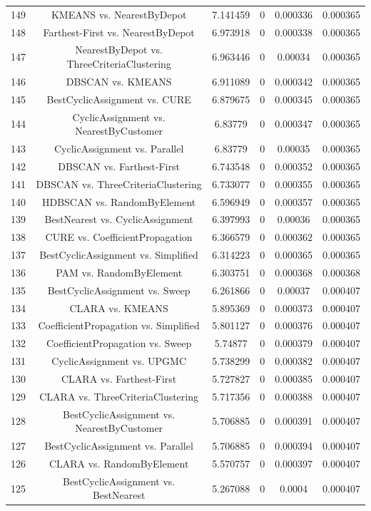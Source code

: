 \documentclass[a4paper,10pt]{article}
\begin{document}
\begin{landscape}
\begin{table}[!htp]
\begin{tabular}{cccccc}
149&KMEANS vs. NearestByDepot&7.141459&0&0.000336&0.000365\\
148&Farthest-First vs. NearestByDepot&6.973918&0&0.000338&0.000365\\
147&NearestByDepot vs. ThreeCriteriaClustering&6.963446&0&0.00034&0.000365\\
146&DBSCAN vs. KMEANS&6.911089&0&0.000342&0.000365\\
145&BestCyclicAssignment vs. CURE&6.879675&0&0.000345&0.000365\\
144&CyclicAssignment vs. NearestByCustomer&6.83779&0&0.000347&0.000365\\
143&CyclicAssignment vs. Parallel&6.83779&0&0.00035&0.000365\\
142&DBSCAN vs. Farthest-First&6.743548&0&0.000352&0.000365\\
141&DBSCAN vs. ThreeCriteriaClustering&6.733077&0&0.000355&0.000365\\
140&HDBSCAN vs. RandomByElement&6.596949&0&0.000357&0.000365\\
139&BestNearest vs. CyclicAssignment&6.397993&0&0.00036&0.000365\\
138&CURE vs. CoefficientPropagation&6.366579&0&0.000362&0.000365\\
137&BestCyclicAssignment vs. Simplified&6.314223&0&0.000365&0.000365\\
136&PAM vs. RandomByElement&6.303751&0&0.000368&0.000368\\
135&BestCyclicAssignment vs. Sweep&6.261866&0&0.00037&0.000407\\
134&CLARA vs. KMEANS&5.895369&0&0.000373&0.000407\\
133&CoefficientPropagation vs. Simplified&5.801127&0&0.000376&0.000407\\
132&CoefficientPropagation vs. Sweep&5.74877&0&0.000379&0.000407\\
131&CyclicAssignment vs. UPGMC&5.738299&0&0.000382&0.000407\\
130&CLARA vs. Farthest-First&5.727827&0&0.000385&0.000407\\
129&CLARA vs. ThreeCriteriaClustering&5.717356&0&0.000388&0.000407\\
128&BestCyclicAssignment vs. NearestByCustomer&5.706885&0&0.000391&0.000407\\
127&BestCyclicAssignment vs. Parallel&5.706885&0&0.000394&0.000407\\
126&CLARA vs. RandomByElement&5.570757&0&0.000397&0.000407\\
125&BestCyclicAssignment vs. BestNearest&5.267088&0&0.0004&0.000407\\

\end{tabular}
\end{table}
\end{landscape}
\end{document}
